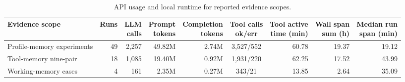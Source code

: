 \begin{table}[!htbp]
\centering
\scriptsize
\setlength{\tabcolsep}{3pt}
\renewcommand{\arraystretch}{1.05}
\caption{API usage and local runtime for reported evidence scopes.}
\label{tab:appendix_compute_accounting}
\begin{tabular*}{\textwidth}{@{\extracolsep{\fill}}lrrrrcrrr@{}}
\toprule
Evidence scope & Runs & \shortstack{LLM\\calls} &
\shortstack{Prompt\\tokens} & \shortstack{Completion\\tokens} &
\shortstack{Tool calls\\ok/err} & \shortstack{Tool active\\time (min)} &
\shortstack{Wall span\\sum (h)} & \shortstack{Median run\\span (min)} \\
\midrule
Profile-memory experiments & 49 & 2{,}257 & 49.82M & 2.74M & 3{,}527/552 & 60.78 & 19.37 & 19.12 \\
Tool-memory nine-pair & 18 & 1{,}085 & 19.40M & 0.92M & 1{,}931/220 & 62.25 & 17.52 & 43.99 \\
Working-memory cases & 4 & 161 & 2.35M & 0.27M & 343/21 & 13.85 & 2.64 & 35.09 \\
\bottomrule
\end{tabular*}
\end{table}
